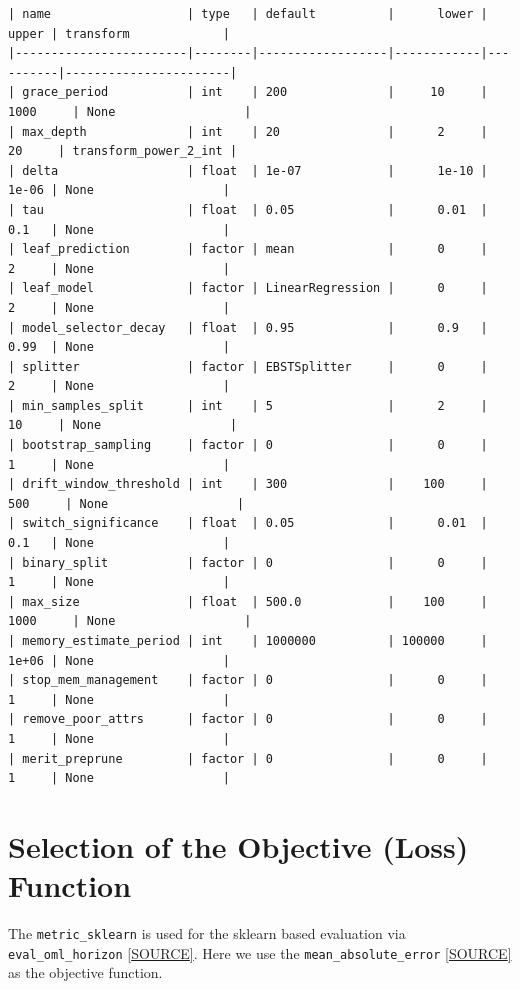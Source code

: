\documentclass[
  letterpaper,
  DIV=11,
  numbers=noendperiod]{scrreprt}
\begin{document}
\begin{verbatim}
| name                   | type   | default          |      lower |    upper | transform             |
|------------------------|--------|------------------|------------|----------|-----------------------|
| grace_period           | int    | 200              |     10     | 1000     | None                  |
| max_depth              | int    | 20               |      2     |   20     | transform_power_2_int |
| delta                  | float  | 1e-07            |      1e-10 |    1e-06 | None                  |
| tau                    | float  | 0.05             |      0.01  |    0.1   | None                  |
| leaf_prediction        | factor | mean             |      0     |    2     | None                  |
| leaf_model             | factor | LinearRegression |      0     |    2     | None                  |
| model_selector_decay   | float  | 0.95             |      0.9   |    0.99  | None                  |
| splitter               | factor | EBSTSplitter     |      0     |    2     | None                  |
| min_samples_split      | int    | 5                |      2     |   10     | None                  |
| bootstrap_sampling     | factor | 0                |      0     |    1     | None                  |
| drift_window_threshold | int    | 300              |    100     |  500     | None                  |
| switch_significance    | float  | 0.05             |      0.01  |    0.1   | None                  |
| binary_split           | factor | 0                |      0     |    1     | None                  |
| max_size               | float  | 500.0            |    100     | 1000     | None                  |
| memory_estimate_period | int    | 1000000          | 100000     |    1e+06 | None                  |
| stop_mem_management    | factor | 0                |      0     |    1     | None                  |
| remove_poor_attrs      | factor | 0                |      0     |    1     | None                  |
| merit_preprune         | factor | 0                |      0     |    1     | None                  |
\end{verbatim}

\section{Selection of the Objective (Loss)
Function}\label{selection-of-the-objective-loss-function}

The \texttt{metric\_sklearn} is used for the sklearn based evaluation
via \texttt{eval\_oml\_horizon}
\href{https://github.com/sequential-parameter-optimization/spotRiver/blob/main/src/spotRiver/evaluation/eval_bml.py}{{[}SOURCE{]}}.
Here we use the \texttt{mean\_absolute\_error}
\href{https://scikit-learn.org/stable/modules/generated/sklearn.metrics.mean_absolute_error.html}{{[}SOURCE{]}}
as the objective function.
\end{document}
